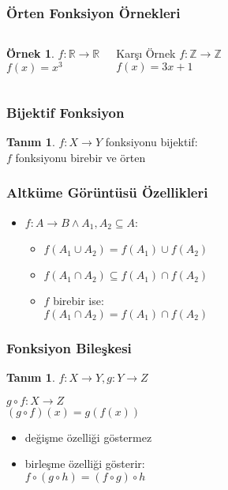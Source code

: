\documentclass[dvipsnames]{beamer}
\theoremstyle{definition}
\newtheorem{tanim}[theorem]{Tanım}
\theoremstyle{example}
\newtheorem{ornek}[theorem]{Örnek}
\theoremstyle{plain}
\begin{document}
\begin{frame}
  \frametitle{Örten Fonksiyon Örnekleri}

  \begin{columns}
    \begin{ornek}
      $f: \mathbb{R} \rightarrow \mathbb{R}$\\
      $f(x) = x^3$
    \end{ornek}

    \pause
    \begin{block}{Karşı Örnek}
      $f: \mathbb{Z} \rightarrow \mathbb{Z}$\\
      $f(x) = 3x + 1$
    \end{block}
  \end{columns}
\end{frame}

\begin{frame}
  \frametitle{Bijektif Fonksiyon}

  \begin{tanim}
    $f: X \rightarrow Y$ fonksiyonu \alert{bijektif}:\\
    $f$ fonksiyonu birebir ve örten
  \end{tanim}
\end{frame}

\begin{frame}
  \frametitle{Altküme Görüntüsü Özellikleri}

  \begin{itemize}
    \item $f: A \rightarrow B \wedge A_1,A_2 \subseteq A$:

    \pause
    \medskip
    \begin{itemize}
      \item $f(A_1 \cup A_2) = f(A_1) \cup f(A_2)$
      \item $f(A_1 \cap A_2) \subseteq f(A_1) \cap f(A_2)$

      \pause
      \medskip
      \item $f$ birebir ise:\\
        $f(A_1 \cap A_2) = f(A_1) \cap f(A_2)$
    \end{itemize}
  \end{itemize}
\end{frame}

\begin{frame}
  \frametitle{Fonksiyon Bileşkesi}

  \begin{tanim}
    $f: X \rightarrow Y, g: Y \rightarrow Z$

    \medskip
    $g \circ f: X \rightarrow Z$\\
    $(g \circ f)(x) = g(f(x))$
  \end{tanim}

  \begin{itemize}
    \item değişme özelliği göstermez
    \item birleşme özelliği gösterir:\\
      $f \circ (g \circ h) = (f \circ g) \circ h$
  \end{itemize}
\end{frame}
\end{document}
